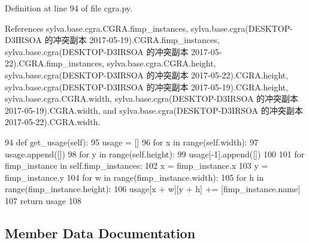 Definition at line 94 of file cgra.\+py.



References sylva.\+base.\+cgra.\+C\+G\+R\+A.\+fimp\+\_\+instances, sylva.\+base.\+cgra(\+D\+E\+S\+K\+T\+O\+P-\/\+D3\+I\+R\+S\+O\+A 的冲突副本 2017-\/05-\/19).\+C\+G\+R\+A.\+fimp\+\_\+instances, sylva.\+base.\+cgra(\+D\+E\+S\+K\+T\+O\+P-\/\+D3\+I\+R\+S\+O\+A 的冲突副本 2017-\/05-\/22).\+C\+G\+R\+A.\+fimp\+\_\+instances, sylva.\+base.\+cgra.\+C\+G\+R\+A.\+height, sylva.\+base.\+cgra(\+D\+E\+S\+K\+T\+O\+P-\/\+D3\+I\+R\+S\+O\+A 的冲突副本 2017-\/05-\/22).\+C\+G\+R\+A.\+height, sylva.\+base.\+cgra(\+D\+E\+S\+K\+T\+O\+P-\/\+D3\+I\+R\+S\+O\+A 的冲突副本 2017-\/05-\/19).\+C\+G\+R\+A.\+height, sylva.\+base.\+cgra.\+C\+G\+R\+A.\+width, sylva.\+base.\+cgra(\+D\+E\+S\+K\+T\+O\+P-\/\+D3\+I\+R\+S\+O\+A 的冲突副本 2017-\/05-\/19).\+C\+G\+R\+A.\+width, and sylva.\+base.\+cgra(\+D\+E\+S\+K\+T\+O\+P-\/\+D3\+I\+R\+S\+O\+A 的冲突副本 2017-\/05-\/22).\+C\+G\+R\+A.\+width.


\begin{DoxyCode}
94     \textcolor{keyword}{def }get\_usage(self):
95         usage = []
96         \textcolor{keywordflow}{for} x \textcolor{keywordflow}{in} range(self.width):
97             usage.append([])
98             \textcolor{keywordflow}{for} y \textcolor{keywordflow}{in} range(self.height):
99                 usage[-1].append([])
100 
101         \textcolor{keywordflow}{for} fimp\_instance \textcolor{keywordflow}{in} self.fimp\_instances:
102             x = fimp\_instance.x
103             y = fimp\_instance.y
104             \textcolor{keywordflow}{for} w \textcolor{keywordflow}{in} range(fimp\_instance.width):
105                 \textcolor{keywordflow}{for} h \textcolor{keywordflow}{in} range(fimp\_instance.height):
106                     usage[x + w][y + h] += [fimp\_instance.name]
107         \textcolor{keywordflow}{return} usage
108 
\end{DoxyCode}


\subsection{Member Data Documentation}
\mbox{\label{classsylva_1_1base_1_1cgra_1_1_c_g_r_a_a9c917482a404c44bfe983498adaefe2b}} 
